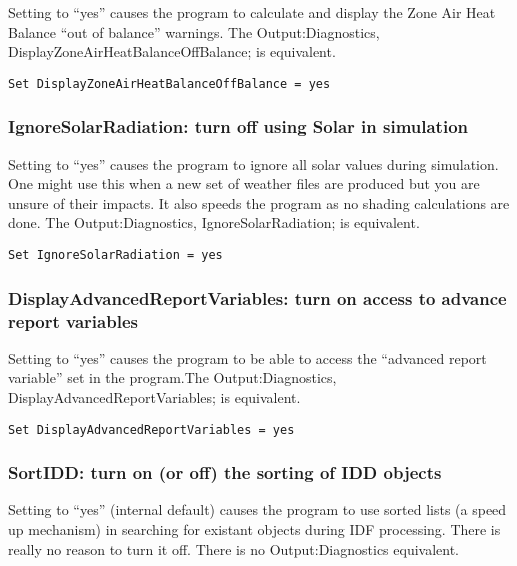 Setting to ``yes'' causes the program to calculate and display the Zone Air Heat Balance ``out of balance'' warnings. The Output:Diagnostics, DisplayZoneAirHeatBalanceOffBalance; is equivalent.

\begin{lstlisting}
Set DisplayZoneAirHeatBalanceOffBalance = yes
\end{lstlisting}

\subsubsection{IgnoreSolarRadiation: turn off using Solar in simulation}\label{ignoresolarradiation-turn-off-using-solar-in-simulation}

Setting to ``yes'' causes the program to ignore all solar values during simulation.~ One might use this when a new set of weather files are produced but you are unsure of their impacts. It also speeds the program as no shading calculations are done. The Output:Diagnostics, IgnoreSolarRadiation; is equivalent.

\begin{lstlisting}
Set IgnoreSolarRadiation = yes
\end{lstlisting}

\subsubsection{DisplayAdvancedReportVariables: turn on access to advance report variables}\label{displayadvancedreportvariables-turn-on-access-to-advance-report-variables}

Setting to ``yes'' causes the program to be able to access the ``advanced report variable'' set in the program.The Output:Diagnostics, DisplayAdvancedReportVariables; is equivalent.

\begin{lstlisting}
Set DisplayAdvancedReportVariables = yes
\end{lstlisting}

\subsubsection{SortIDD: turn on (or off) the sorting of IDD objects}\label{sortidd-turn-on-or-off-the-sorting-of-idd-objects}

Setting to ``yes'' (internal default) causes the program to use sorted lists (a speed up mechanism) in searching for existant objects during IDF processing. There is really no reason to turn it off. There is no Output:Diagnostics equivalent.

